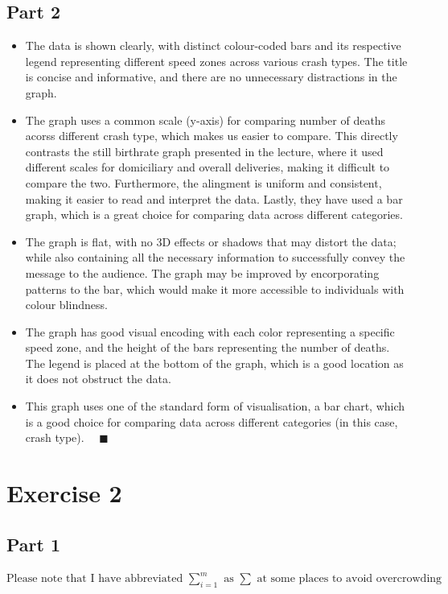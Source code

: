 \documentclass{article}
\begin{document}
\subsection*{Part 2}
\begin{itemize}
    \item The data is shown clearly, with distinct colour-coded bars and its respective legend representing different speed zones across various crash types. The title is concise and informative, and there are no unnecessary distractions in the graph.
    \item The graph uses a common scale (y-axis) for comparing number of deaths acorss different crash type, which makes us easier to compare. This directly contrasts the still birthrate graph presented in the lecture, where it used different scales for domiciliary and overall deliveries, making it difficult to compare the two. Furthermore, the alingment is uniform and consistent, making it easier to read and interpret the data. Lastly, they have used a bar graph, which is a great choice for comparing data across different categories.
    \item The graph is flat, with no 3D effects or shadows that may distort the data; while also containing all the necessary information to successfully convey the message to the audience. The graph may be improved by encorporating patterns to the bar, which would make it more accessible to individuals with colour blindness.
    \item The graph has good visual encoding with each color representing a specific speed zone, and the height of the bars representing the number of deaths. The legend is placed at the bottom of the graph, which is a good location as it does not obstruct the data.
    \item This graph uses one of the standard form of visualisation, a bar chart, which is a good choice for comparing data across different categories (in this case, crash type). $\quad \blacksquare$
\end{itemize}


\newpage
\section*{Exercise 2}

\subsection*{Part 1}

$\text{Please note that I have abbreviated } \sum_{i=1}^m \text{ as } \sum \text{ at some places to avoid overcrowding}$
\end{document}
